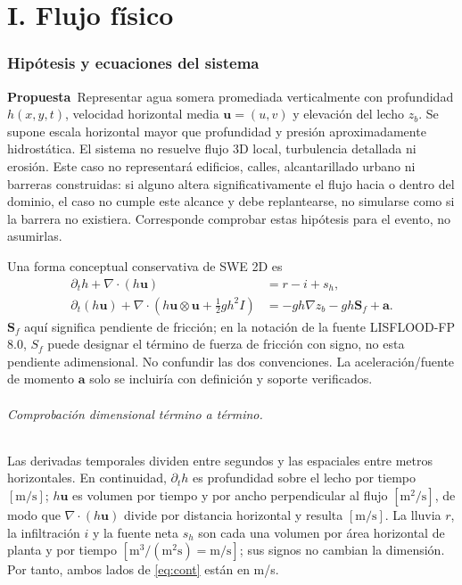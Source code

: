 \documentclass[11pt,a4paper]{article}
\newcommand{\prop}{\textbf{Propuesta}}
\begin{document}
\part{I. Flujo físico}
\section{Hipótesis y ecuaciones del sistema}
\prop\ Representar agua somera promediada verticalmente con profundidad $h(x,y,t)$, velocidad horizontal media $\boldsymbol u=(u,v)$ y elevación del lecho $z_b$. Se supone escala horizontal mayor que profundidad y presión aproximadamente hidrostática. El sistema no resuelve flujo 3D local, turbulencia detallada ni erosión. Este caso no representará edificios, calles, alcantarillado urbano ni barreras construidas: si alguno altera significativamente el flujo hacia o dentro del dominio, el caso no cumple este alcance y debe replantearse, no simularse como si la barrera no existiera. Corresponde comprobar estas hipótesis para el evento, no asumirlas.

Una forma conceptual conservativa de SWE 2D es
\begin{align}
\partial_t h+\nabla\cdot(h\boldsymbol u)&=r-i+s_h, \label{eq:cont}\\
\partial_t(h\boldsymbol u)+\nabla\cdot\left(h\boldsymbol u\otimes\boldsymbol u+\tfrac12gh^2 I\right)&=-gh\nabla z_b-gh\boldsymbol S_f+\boldsymbol a. \label{eq:mom}
\end{align}
$\boldsymbol S_f$ aquí significa pendiente de fricción; en la notación de la fuente LISFLOOD-FP 8.0, $S_f$ puede designar el término de fuerza de fricción con signo, no esta pendiente adimensional. No confundir las dos convenciones. La aceleración/fuente de momento $\boldsymbol a$ solo se incluiría con definición y soporte verificados.

\paragraph{Comprobación dimensional término a término.} Las derivadas temporales dividen entre segundos y las espaciales entre metros horizontales. En continuidad, $\partial_t h$ es profundidad sobre el lecho por tiempo $[\mathrm{m/s}]$; $h\boldsymbol u$ es volumen por tiempo y por ancho perpendicular al flujo $[\mathrm{m^2/s}]$, de modo que $\nabla\cdot(h\boldsymbol u)$ divide por distancia horizontal y resulta $[\mathrm{m/s}]$. La lluvia $r$, la infiltración $i$ y la fuente neta $s_h$ son cada una volumen por área horizontal de planta y por tiempo $[\mathrm{m^3/(m^2s)}=\mathrm{m/s}]$; sus signos no cambian la dimensión. Por tanto, ambos lados de \eqref{eq:cont} están en m/s.
\end{document}
